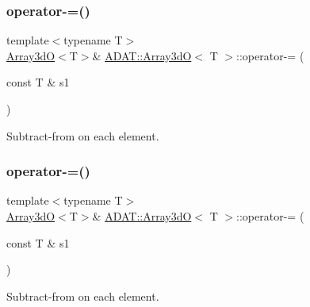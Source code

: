\subsubsection{\texorpdfstring{operator-\/=()}{operator-=()}\hspace{0.1cm}{\footnotesize\ttfamily [4/6]}}
{\footnotesize\ttfamily template$<$typename T$>$ \\
\mbox{\hyperlink{classADAT_1_1Array3dO}{Array3dO}}$<$T$>$\& \mbox{\hyperlink{classADAT_1_1Array3dO}{A\+D\+A\+T\+::\+Array3dO}}$<$ T $>$\+::operator-\/= (\begin{DoxyParamCaption}\item[{const T \&}]{s1 }\end{DoxyParamCaption})\hspace{0.3cm}{\ttfamily [inline]}}



Subtract-\/from on each element. 

\mbox{\label{classADAT_1_1Array3dO_a0341b7ddc224910074b55646bca45e2a}} 
\subsubsection{\texorpdfstring{operator-\/=()}{operator-=()}\hspace{0.1cm}{\footnotesize\ttfamily [5/6]}}
{\footnotesize\ttfamily template$<$typename T$>$ \\
\mbox{\hyperlink{classADAT_1_1Array3dO}{Array3dO}}$<$T$>$\& \mbox{\hyperlink{classADAT_1_1Array3dO}{A\+D\+A\+T\+::\+Array3dO}}$<$ T $>$\+::operator-\/= (\begin{DoxyParamCaption}\item[{const T \&}]{s1 }\end{DoxyParamCaption})\hspace{0.3cm}{\ttfamily [inline]}}



Subtract-\/from on each element. 

\mbox{\label{classADAT_1_1Array3dO_a0341b7ddc224910074b55646bca45e2a}} 

